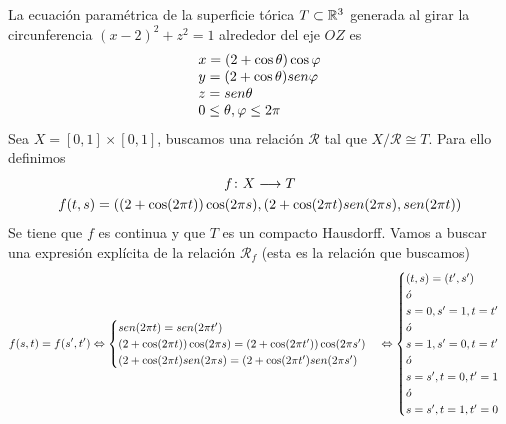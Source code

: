 \documentclass[GTS.tex]{subfiles}
\begin{document}
\begin{ej}[Toro]
La ecuación paramétrica de la superficie tórica $T\subset\mathbb{R}^3$ generada al girar la circunferencia $(x-2)^2+z^2=1$ alrededor del eje $OZ$ es
\[
\begin{array}{l}
x=(2+\cos\theta)\cos\varphi\\
y=(2+\cos\theta)sen \varphi\\
z=sen \theta\\
0\leq\theta,\varphi\leq 2\pi

\end{array}
\]
Sea $X=[0,1]\times[0,1]$, buscamos una relación $\mathcal{R}$ tal que $X/\mathcal{R}\cong T$. Para ello definimos
\begin{gather*}
f\colon{X}\longrightarrow{T}\\
f(t,s)=((2+\cos(2\pi t))\cos(2\pi s), (2+\cos(2\pi t)sen (2\pi s), sen (2\pi t))
\end{gather*}
Se tiene que $f$ es continua y que $T$ es un compacto Hausdorff. Vamos a buscar una expresión explícita de la relación $\mathcal{R}_f$ (esta es la relación que buscamos)
\begin{gather*}
f(s,t)=f(s',t')\Leftrightarrow\begin{cases}
sen (2\pi t)=sen (2\pi t')\\
(2+\cos(2\pi t))\cos(2\pi s)=(2+\cos(2\pi t'))\cos(2\pi s')\\
(2+\cos(2\pi t)sen (2\pi s)=(2+\cos(2\pi t')sen (2\pi s')
\end{cases}\Leftrightarrow\begin{cases}
(t,s)=(t',s')\\
\acute{o}\\
s=0,s'=1, t=t'\\
\acute{o}\\
s=1,s'=0, t=t'\\
\acute{o}\\
s=s', t=0,t'=1\\
\acute{o}\\
s=s',t=1,t'=0
\end{cases}
\end{gather*}
\end{ej}
\end{document}
